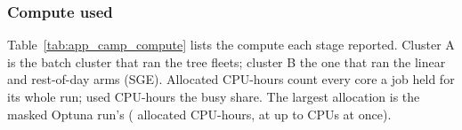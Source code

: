 \begin{table}[H]
\centering
\caption{The \texttt{har\_ma\_*} ladder's importance in the trees, first pass (old design,
unmasked) to the new design with the mask: MDI and TreeSHAP shares, permutation (P2,
QLIKE) in \% of the model's tail loss, the part of the old ladder's MDI that sat on the
\texttt{\_x\_close} copies, and the ladder's MDI rank among the series.}
\label{tab:app_camp_featimp}
\campfit{\scriptsize}
\end{table}


\subsubsection{Compute used}
\label{sec:app_camp_compute}

Table~\ref{tab:app_camp_compute} lists the compute each stage reported. Cluster A is the
batch cluster that ran the tree fleets;
cluster B the one that ran the
linear and rest-of-day arms (SGE). Allocated CPU-hours count every core a job held for its
whole run; used CPU-hours the busy share. The largest allocation is the masked Optuna run's
(\campComputeOptunaAlloc{} allocated CPU-hours, at up to \campComputeOptunaPeak{} CPUs at
once).


